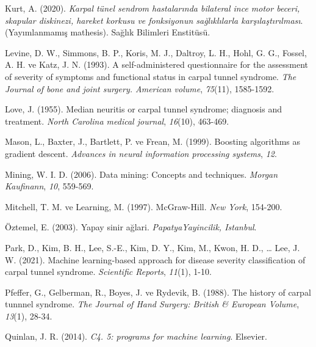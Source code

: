 \documentclass[12pt,twoside]{deuthesis}
\begin{document}
\begin{CSLReferences}
\leavevmode{}%
Kurt, A. (2020). \emph{Karpal tünel sendrom hastalarında bilateral ince motor beceri, skapular diskinezi, hareket korkusu ve fonksiyonun sağlıklılarla karşılaştırılması}. (Yayımlanmamış mathesis). Sağlık Bilimleri Enstitüsü.

\leavevmode{}%
Levine, D. W., Simmons, B. P., Koris, M. J., Daltroy, L. H., Hohl, G. G., Fossel, A. H. ve Katz, J. N. (1993). A self-administered questionnaire for the assessment of severity of symptoms and functional status in carpal tunnel syndrome. \emph{The Journal of bone and joint surgery. American volume}, \emph{75}(11), 1585-1592.

\leavevmode{}%
Love, J. (1955). Median neuritis or carpal tunnel syndrome; diagnosis and treatment. \emph{North Carolina medical journal}, \emph{16}(10), 463-469.

\leavevmode{}%
Mason, L., Baxter, J., Bartlett, P. ve Frean, M. (1999). Boosting algorithms as gradient descent. \emph{Advances in neural information processing systems}, \emph{12}.

\leavevmode{}%
Mining, W. I. D. (2006). Data mining: Concepts and techniques. \emph{Morgan Kaufinann}, \emph{10}, 559-569.

\leavevmode{}%
Mitchell, T. M. ve Learning, M. (1997). McGraw-Hill. \emph{New York}, 154-200.

\leavevmode{}%
Öztemel, E. (2003). Yapay sinir ağlari. \emph{PapatyaYayincilik, Istanbul}.

\leavevmode{}%
Park, D., Kim, B. H., Lee, S.-E., Kim, D. Y., Kim, M., Kwon, H. D., \ldots{} Lee, J. W. (2021). Machine learning-based approach for disease severity classification of carpal tunnel syndrome. \emph{Scientific Reports}, \emph{11}(1), 1-10.

\leavevmode{}%
Pfeffer, G., Gelberman, R., Boyes, J. ve Rydevik, B. (1988). The history of carpal tunnnel syndrome. \emph{The Journal of Hand Surgery: British \& European Volume}, \emph{13}(1), 28-34.

\leavevmode{}%
Quinlan, J. R. (2014). \emph{C4. 5: programs for machine learning}. Elsevier.


\end{CSLReferences}
\end{document}

